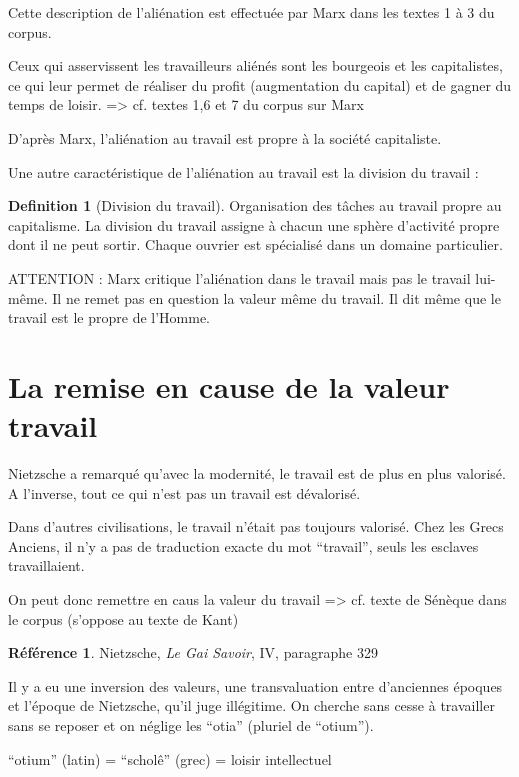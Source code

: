 \documentclass[french]{book}
\theoremstyle{definition}
\newtheorem*{dfn}{Definition}
\newtheorem*{refe}{Référence}
\begin{document}
Cette description de l’aliénation est effectuée par Marx dans les textes 1 à 3 du corpus.

Ceux qui asservissent les travailleurs aliénés sont les bourgeois et les capitalistes, ce qui leur permet de réaliser du profit (augmentation du capital) et de gagner du temps de loisir.
=> cf. textes 1,6 et 7 du corpus sur Marx

D’après Marx, l’aliénation au travail est propre à la société capitaliste.

Une autre caractéristique de l’aliénation au travail est la division du travail : 

\begin{dfn}[Division du travail]
Organisation des tâches au travail propre au capitalisme. La division du travail assigne à chacun une sphère d’activité propre dont il ne peut sortir. Chaque ouvrier est spécialisé dans un domaine particulier.
\end{dfn}

ATTENTION : Marx critique l'aliénation dans le travail mais pas le travail lui-même. Il ne remet pas en question la valeur même du travail. Il dit même que le travail est le propre de l'Homme. 

\section{La remise en cause de la valeur travail}

Nietzsche a remarqué qu’avec la modernité, le travail est de plus en plus valorisé. A l'inverse, tout ce qui n’est pas un travail est dévalorisé. 

Dans d’autres civilisations, le travail n’était pas toujours valorisé. Chez les Grecs Anciens, il n’y a pas de traduction exacte du mot “travail”, seuls les esclaves travaillaient.

On peut donc remettre en caus la valeur du travail => cf. texte de Sénèque dans le corpus (s’oppose au texte de Kant)

\begin{refe}
	Nietzsche, \textit{Le Gai Savoir}, IV, paragraphe 329
\end{refe}

Il y a eu une inversion des valeurs, une transvaluation entre d’anciennes époques et l’époque de Nietzsche, qu’il juge illégitime. On cherche sans cesse à travailler sans se reposer et on néglige les “otia” (pluriel de “otium”).

“otium” (latin) = “scholê” (grec) = loisir intellectuel
\end{document}
